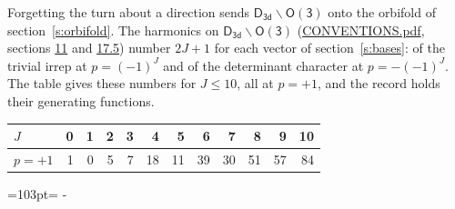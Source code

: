 \documentclass[10pt,a4paper]{article}
\newcommand{\needspace}[1]{\par\penalty-100\begingroup\dimen0=#1\relax\dimen2=\pagegoal
  \advance\dimen2-\pagetotal\ifdim\dimen0>\dimen2\relax\ifdim\dimen2>0pt\vfil\break\fi\fi
  \endgroup}
\numberwithin{equation}{section}
\newcommand{\grp}[1]{\mathsf{#1}}
\begin{document}
Forgetting the turn about a direction sends $\grp{D_{3d}}\backslash\grp{O(3)}$ onto the orbifold of section~\ref{s:orbifold}.
The harmonics on $\grp{D_{3d}}\backslash\grp{O(3)}$ (\href{../../CONVENTIONS.pdf}{CONVENTIONS.pdf}, sections \href{../../CONVENTIONS.pdf\#conv.11}{11} and \href{../../CONVENTIONS.pdf\#conv.17.5}{17.5}) number $2J + 1$ for each vector of section~\ref{s:bases}: of the trivial irrep at $p = (-1)^J$ and of the determinant character at $p = -(-1)^J$. The table gives these numbers for $J \le 10$, all at $p = +1$, and the record holds their generating functions.
{\small\setlength{\tabcolsep}{4pt}\begin{longtable}{@{}lrrrrrrrrrrr@{}}\toprule
$J$ & 0 & 1 & 2 & 3 & 4 & 5 & 6 & 7 & 8 & 9 & 10\\\midrule\endhead
\bottomrule\endfoot\endlastfoot
$p = +1$ & 1 & 0 & 5 & 7 & 18 & 11 & 39 & 30 & 51 & 57 & 84\\
\bottomrule\end{longtable}}
\needspace{103pt}
\end{document}
